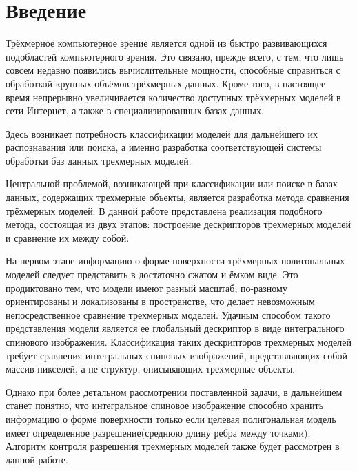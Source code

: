 \documentclass[14pt]{article}
\numberwithin{figure}{section}
\numberwithin{equation}{section}
\begin{document}

\newpage

\pagestyle{plain} %
\setcounter{page}{2} %
\tableofcontents

\newpage

\section*{Введение}

Трёхмерное компьютерное зрение является одной из быстро развивающихся подобластей компьютерного зрения. Это связано, прежде всего, с тем, что лишь совсем недавно появились вычислительные мощности, способные справиться с обработкой крупных объёмов трёхмерных данных. Кроме того, в настоящее время непрерывно увеличивается количество доступных трёхмерных моделей в сети Интернет, а также в специализированных базах данных.

Здесь возникает потребность классификации моделей для дальнейшего их распознавания или поиска, а именно разработка соответствующей системы обработки баз данных трехмерных моделей.

Центральной проблемой, возникающей при классификации или поиске в базах данных, содержащих трехмерные объекты, является разработка метода сравнения трёхмерных моделей. В данной работе представлена реализация подобного метода, состоящая из двух этапов: построение дескрипторов трехмерных моделей и сравнение их между собой.

На первом этапе информацию о форме поверхности трёхмерных полигональных моделей следует представить в достаточно сжатом и ёмком виде. Это продиктовано тем, что модели имеют разный масштаб, по-разному ориентированы и локализованы в пространстве, что делает невозможным непосредственное сравнение трехмерных моделей. Удачным способом такого представления модели является ее глобальный дескриптор в виде интегрального спинового изображения. Классификация таких дескрипторов трехмерных моделей требует сравнения интегральных спиновых изображений, представляющих собой массив пикселей, а не структур, описывающих трехмерные объекты.

Однако при более детальном рассмотрении поставленной задачи, в дальнейшем станет понятно, что интегральное спиновое изображение способно хранить информацию о форме поверхности только если целевая полигональная модель имеет определенное разрешение(среднюю длину ребра между точками). Алгоритм контроля разрешения трехмерных моделей также будет рассмотрен в данной работе.
\end{document}
